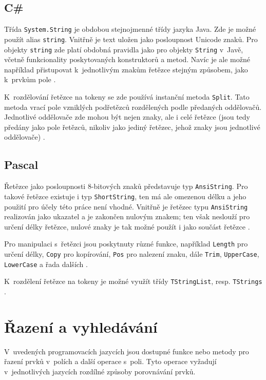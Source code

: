 \documentclass[onepage, a4paper, 12pt]{bakalarka}
\begin{document}
\subsection{C\#}
Třída \texttt{System.String} je obdobou stejnojmenné třídy jazyka Java. Zde je možné použít alias \texttt{string}. Vnitřně je text uložen jako posloupnost Unicode znaků. Pro objekty \texttt{string} zde platí obdobná pravidla jako pro objekty \texttt{String} v~Javě, včetně funkcionality poskytovaných konstruktorů a metod. Navíc je ale možné například přistupovat k~jednotlivým znakům řetězce stejným způsobem, jako k~prvkům pole \cite{cs-guide-stringclass}.\par
K~rozdělování řetězce na tokeny se zde používá instanční metoda \texttt{Split}. Tato metoda vrací pole vzniklých podřetězců rozdělených podle předaných oddělovačů. Jednotlivé oddělovače zde mohou být nejen znaky, ale i celé řetězce (jsou tedy předány jako pole řetězců, nikoliv jako jediný řetězec, jehož znaky jsou jednotlivé oddělovače) \cite{cs-guide-stringsplit}.

\subsection{Pascal}
Řetězce jako posloupnosti 8-bitových znaků představuje typ \texttt{AnsiString}. Pro takové řetězce existuje i typ \texttt{ShortString}, ten má ale omezenou délku a jeho použití pro účely této práce není vhodné. Vnitřně je řetězec typu \texttt{AnsiString} realizován jako ukazatel a je zakončen nulovým znakem; ten však neslouží pro určení délky řetězce, nulové znaky je tak možné použít i jako součást řetězce \cite{pas-guide-strings, pas-guide-shortstring, pas-guide-ansistring}.\par
Pro manipulaci s~řetězci jsou poskytnuty různé funkce, například \texttt{Length} pro určení délky, \texttt{Copy} pro kopírování, \texttt{Pos} pro nalezení znaku, dále \texttt{Trim}, \texttt{UpperCase}, \texttt{LowerCase} a řada dalších \cite{pas-guide-system}.\par
K~rozdělení řetězce na tokeny je možné využít třídy \texttt{TStringList}, resp. \texttt{TStrings} \cite{pas-guide-tstringlist, pas-guide-tstrings}.

\section{Řazení a vyhledávání}\label{sec:sorting}
V~uvedených programovacích jazycích jsou dostupné funkce nebo metody pro řazení prvků v~polích a další operace s~poli. Tyto operace vyžadují v~jednotlivých jazycích rozdílné způsoby porovnávání prvků.
\end{document}
